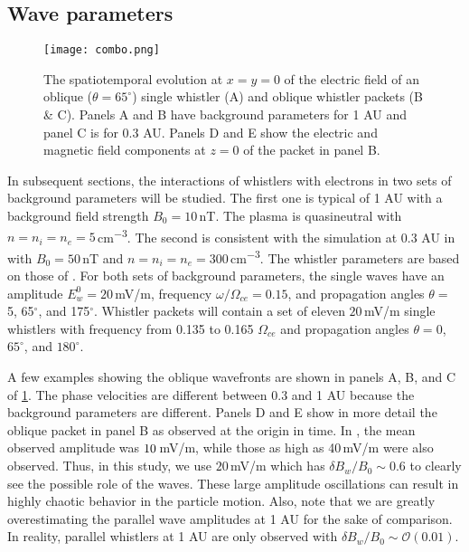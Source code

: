 

\subsection{Wave parameters}

\begin{figure}[t]
    \centering
    \texttt{[image: combo.png]}
    \caption{The spatiotemporal evolution at $x=y=0$ of the electric field of an
        oblique ($\theta=65^\circ$) single whistler (A) and oblique whistler
    packets (B \& C). Panels A and B have background parameters for 1 AU and
panel C is for 0.3 AU. Panels D and E show the electric and magnetic field
components at $z=0$ of the packet in panel B.}
    \label{fig:wavefronts}
\end{figure}

In subsequent sections, the interactions of whistlers with electrons in two sets
of background parameters will be studied. The first one is typical of 1 AU with a background field strength $B_0=10$\,\si{nT}. The plasma is quasineutral with $n=n_i=n_e=5$\,\si{cm\tothe{-3}}. The second is consistent with the simulation at 0.3 AU in \cite{Micera2020} with $B_0=50$\,\si{nT} and
$n=n_i=n_e=300$\,\si{cm\tothe{-3}}. The whistler parameters are based on those of \cite{Cattell2020}. For both sets
of background parameters, the single waves have an amplitude
$E_w^0=20$\,\si{mV/m}, frequency $\omega/\Omega_{ce}=0.15$, and propagation
angles $\theta=$ 5, 65$^\circ$, and 175$^\circ$. Whistler packets will contain a
set of eleven $20$\,\si{mV/m} single whistlers with frequency from 0.135 to
0.165 $\Omega_{ce}$ and propagation angles $\theta=0$, $65^\circ$, and
$180^\circ$.

A few examples showing the oblique wavefronts are shown in panels
A, B, and C of \cref{fig:wavefronts}. The phase velocities are different between 0.3 and 1 AU because the background parameters are different. Panels D and E show in more detail the oblique packet in panel B as observed at the origin in time. In \cite{Cattell2020}, the mean observed amplitude was $\si10$\,\si{mV/m}, while those as high as 40\,\si{mV/m} were also observed. Thus, in this study, we use $20$\,\si{mV/m} which has $\delta B_w/B_0\sim0.6$ to clearly see the possible role of the waves. These large amplitude oscillations can result in highly chaotic behavior in the particle motion. Also, note that we are greatly overestimating the parallel wave amplitudes at 1 AU for the sake of comparison. In reality, parallel whistlers at 1 AU are only observed with $\delta B_w/B_0\sim\mathcal{O}(0.01)$.

